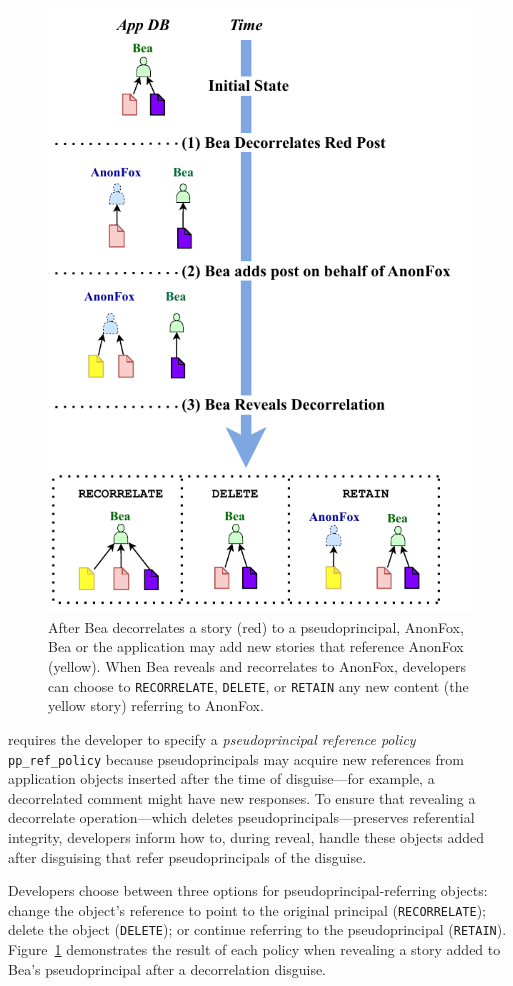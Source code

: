 \begin{figure}
    \centering
    \includegraphics[width=.7\textwidth]{figs/ppreveal_policies}
    \caption[\texttt{RECORRELATE}, \texttt{DELETE}, and
    \texttt{RETAIN} policies maintain referential integrity for objects added
    after disguising that refer to a pseudoprincipal during reveal.]{After Bea
    decorrelates a story (red) to a pseudoprincipal, AnonFox, Bea or the
    application may add new stories that reference AnonFox (yellow). When Bea
    reveals and recorrelates to AnonFox, developers can
    choose to \texttt{RECORRELATE}, \texttt{DELETE}, or \texttt{RETAIN} any new
    content (\ie the yellow story) referring to AnonFox.}
\label{f:ppreveal}
\end{figure}
%

\sys requires the developer to specify a \emph{pseudoprincipal reference
policy} \texttt{pp\_ref\_policy} because pseudoprincipals may acquire new references
from application objects inserted after the time of disguise---for example, a
decorrelated comment might have new responses. To ensure that revealing a
decorrelate operation---which deletes pseudoprincipals---preserves referential
integrity, developers inform \sys how to, during reveal, handle these objects
added after disguising that refer pseudoprincipals of the disguise.%

Developers choose between three options for
pseudoprincipal-referring objects: \one{} change the object's
reference to point to the original principal (\texttt{RECORRELATE});
\two{} delete the object (\texttt{DELETE}); or \three{} continue
referring to the pseudoprincipal (\texttt{RETAIN}).
Figure~\ref{f:ppreveal} demonstrates the result of each policy when
revealing a story added to Bea's pseudoprincipal after a
decorrelation disguise.


